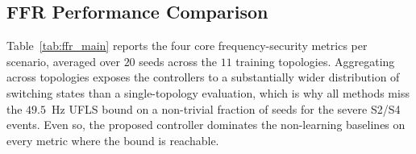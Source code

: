 \subsection{FFR Performance Comparison}
\label{ssec:results_am}

Table~\ref{tab:ffr_main} reports the four core frequency-security
metrics per scenario, averaged over $20$ seeds across the $11$
training topologies. Aggregating across topologies exposes the
controllers to a substantially wider distribution of switching states
than a single-topology evaluation, which is why all methods miss the
$49.5$~Hz UFLS bound on a non-trivial fraction of seeds for the
severe S2/S4 events. Even so, the proposed controller dominates the
non-learning baselines on every metric where the bound is reachable.


